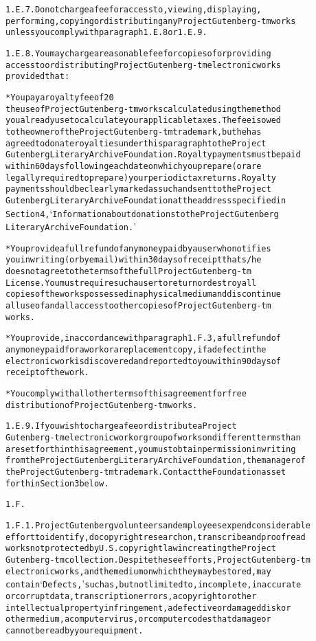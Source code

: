 \documentclass[12pt]{book}[2005/09/16]
\newenvironment{PGtext}{%
\begin{alltt}
\fontsize{9.2}{10.5}\ttfamily\selectfont}%
{\end{alltt}}
\begin{document}
\begin{PGtext}
1.E.7. Do not charge a fee for access to, viewing, displaying,
performing, copying or distributing any Project Gutenberg-tm works
unless you comply with paragraph 1.E.8 or 1.E.9.

1.E.8. You may charge a reasonable fee for copies of or providing
access to or distributing Project Gutenberg-tm electronic works
provided that:

* You pay a royalty fee of 20%
  the use of Project Gutenberg-tm works calculated using the method
  you already use to calculate your applicable taxes. The fee is owed
  to the owner of the Project Gutenberg-tm trademark, but he has
  agreed to donate royalties under this paragraph to the Project
  Gutenberg Literary Archive Foundation. Royalty payments must be paid
  within 60 days following each date on which you prepare (or are
  legally required to prepare) your periodic tax returns. Royalty
  payments should be clearly marked as such and sent to the Project
  Gutenberg Literary Archive Foundation at the address specified in
  Section 4, `Information about donations to the Project Gutenberg
  Literary Archive Foundation.'

* You provide a full refund of any money paid by a user who notifies
  you in writing (or by email) within 30 days of receipt that s/he
  does not agree to the terms of the full Project Gutenberg-tm
  License. You must require such a user to return or destroy all
  copies of the works possessed in a physical medium and discontinue
  all use of and all access to other copies of Project Gutenberg-tm
  works.

* You provide, in accordance with paragraph 1.F.3, a full refund of
  any money paid for a work or a replacement copy, if a defect in the
  electronic work is discovered and reported to you within 90 days of
  receipt of the work.

* You comply with all other terms of this agreement for free
  distribution of Project Gutenberg-tm works.

1.E.9. If you wish to charge a fee or distribute a Project
Gutenberg-tm electronic work or group of works on different terms than
are set forth in this agreement, you must obtain permission in writing
from the Project Gutenberg Literary Archive Foundation, the manager of
the Project Gutenberg-tm trademark. Contact the Foundation as set
forth in Section 3 below.

1.F.

1.F.1. Project Gutenberg volunteers and employees expend considerable
effort to identify, do copyright research on, transcribe and proofread
works not protected by U.S. copyright law in creating the Project
Gutenberg-tm collection. Despite these efforts, Project Gutenberg-tm
electronic works, and the medium on which they may be stored, may
contain `Defects,' such as, but not limited to, incomplete, inaccurate
or corrupt data, transcription errors, a copyright or other
intellectual property infringement, a defective or damaged disk or
other medium, a computer virus, or computer codes that damage or
cannot be read by your equipment.


\end{PGtext}
\end{document}
